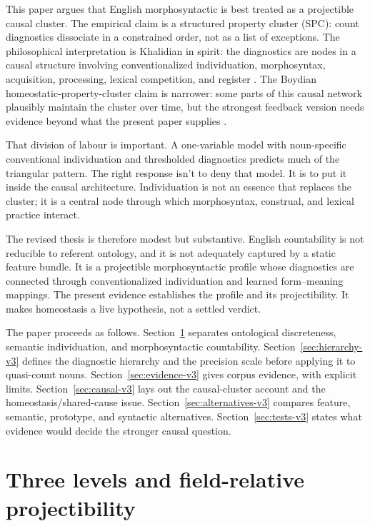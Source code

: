 \documentclass[12pt,a4paper]{article}
\begin{document}
This paper argues that English morphosyntactic  is best treated as a projectible causal cluster. The empirical claim is a structured property cluster (SPC): count diagnostics dissociate in a constrained order, not as a list of exceptions. The philosophical interpretation is Khalidian in spirit: the diagnostics are nodes in a causal structure involving conventionalized individuation, morphosyntax, acquisition, processing, lexical competition, and register \citep{khalidi2013}. The Boydian homeostatic-property-cluster claim is narrower: some parts of this causal network plausibly maintain the cluster over time, but the strongest feedback version needs evidence beyond what the present paper supplies \citep{boyd1991,boyd1999}.

That division of labour is important. A one-variable model with noun-specific conventional individuation and thresholded diagnostics predicts much of the triangular pattern. The right response isn't to deny that model. It is to put it inside the causal architecture. Individuation is not an essence that replaces the cluster; it is a central node through which morphosyntax, construal, and lexical practice interact.

The revised thesis is therefore modest but substantive. English countability is not reducible to referent ontology, and it is not adequately captured by a static feature bundle. It is a projectible morphosyntactic profile whose diagnostics are connected through conventionalized individuation and learned form--meaning mappings. The present evidence establishes the profile and its projectibility. It makes homeostasis a live hypothesis, not a settled verdict.

The paper proceeds as follows. Section~\ref{sec:levels-v3} separates ontological discreteness, semantic individuation, and morphosyntactic countability. Section~\ref{sec:hierarchy-v3} defines the diagnostic hierarchy and the precision scale before applying it to quasi-count nouns. Section~\ref{sec:evidence-v3} gives corpus evidence, with explicit limits. Section~\ref{sec:causal-v3} lays out the causal-cluster account and the homeostasis/shared-cause issue. Section~\ref{sec:alternatives-v3} compares feature, semantic, prototype, and syntactic alternatives. Section~\ref{sec:tests-v3} states what evidence would decide the stronger causal question.

\section{Three levels and field-relative projectibility}\label{sec:levels-v3}
\end{document}

